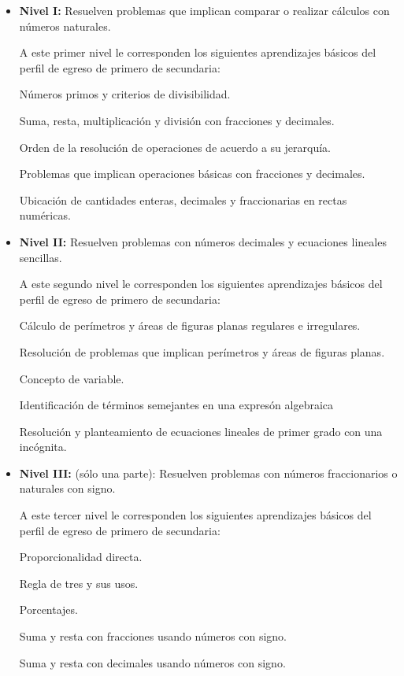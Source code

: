 \documentclass[11pt]{article}
\begin{document}
\hfill%
\begin{itemize}
\item \textbf{Nivel I:} Resuelven problemas que implican comparar o realizar c\'alculos con
n\'umeros naturales.

A este primer nivel le corresponden los siguientes aprendizajes b\'asicos del perfil de egreso de primero de secundaria:

\qquad N\'umeros primos y criterios de divisibilidad.

\qquad Suma, resta, multiplicaci\'on y divisi\'on con fracciones y decimales.

\qquad Orden de la resoluci\'on de operaciones de acuerdo a su jerarqu\'ia.

\qquad Problemas que implican operaciones b\'asicas con fracciones y decimales.

\qquad Ubicaci\'on de cantidades enteras, decimales y fraccionarias en rectas num\'ericas.

\item \textbf{Nivel II:} Resuelven problemas con n\'umeros decimales y ecuaciones lineales
sencillas.

A este segundo nivel le corresponden los siguientes aprendizajes b\'asicos del perfil de egreso de primero de secundaria:

\qquad C\'alculo de per\'imetros y \'areas de figuras planas regulares e irregulares.

\qquad Resoluci\'on de problemas que implican per\'imetros y \'areas de figuras planas.

\qquad Concepto de variable.

\qquad Identificaci\'on de t\'erminos semejantes en una expres\'on algebraica 

\qquad Resoluci\'on y planteamiento de ecuaciones lineales de primer grado con una inc\'ognita.

\newpage

\item \textbf{Nivel III:} (s\'olo una parte): Resuelven problemas con n\'umeros fraccionarios o
naturales con signo.

A este tercer nivel le corresponden los siguientes aprendizajes b\'asicos del perfil de egreso de primero de secundaria:

\qquad Proporcionalidad directa.

\qquad Regla de tres y sus usos.

\qquad Porcentajes.

\qquad Suma y resta con fracciones usando n\'umeros con signo.

\qquad Suma y resta con decimales usando n\'umeros con signo.



\end{itemize}
\end{document}
